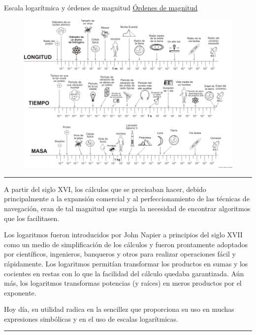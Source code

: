 \begin{myexampleblock}{Escala logarítmica y órdenes de magnitud}
\underline{Órdenes de magnitud}
\begin{figure}[H]
	\centering
	\includegraphics[width=1\textwidth]{img-reales/reales14.png}
	\end{figure}

\end{myexampleblock}

\color{teal}
\rule{250pt}{0.1pt}	

A partir del siglo XVI, los cálculos que se precisaban hacer, debido principalmente a la expansión comercial y al perfeccionamiento de las técnicas de navegación, eran de tal magnitud que surgía la necesidad de encontrar algoritmos que los facilitasen. 

\vspace{3mm} Los logaritmos fueron introducidos por John Napier a principios del siglo XVII como un medio de simplificación de los cálculos y fueron prontamente adoptados por científicos, ingenieros, banqueros y otros para realizar operaciones fácil y rápidamente. Los logaritmos permitían transformar los productos en sumas y los cocientes en restas con lo que la facilidad del cálculo quedaba garantizada. Aún más, los logaritmos transformas potencias (y raíces) en meros productos por el exponente. 

\vspace{3mm} Hoy día, su utilidad radica en la sencillez que proporciona su uso en muchas expresiones simbólicas y en el uso de escalas logarítmicas.

\begin{center}
\rule{200pt}{0.1pt}	
\end{center}

